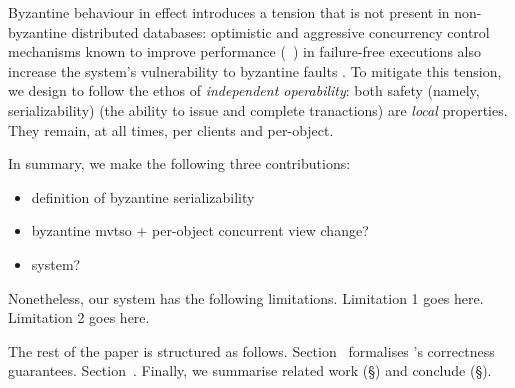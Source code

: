 Byzantine behaviour in effect introduces a tension that is not present in non-byzantine
distributed databases: optimistic and aggressive concurrency control mechanisms known
to improve performance (~\cite{occ,mvtso,pipeline,tapir}) in failure-free executions also increase the system's vulnerability to byzantine faults . To mitigate this tension, we design \sys{} to follow the ethos of \textit{independent operability}: both safety (namely, serializability) (the ability to issue and complete tranactions)
are \textit{local} properties. They remain, at all times, per clients and per-object.
 

In summary, we make the following three contributions: 
\begin{itemize}
\item definition of byzantine serializability
\item  byzantine mvtso + per-object concurrent view change?
\item system?
\end{itemize}

Nonetheless, our system has the following limitations. Limitation 1 goes here. Limitation 2 goes here.

The rest of the paper is structured as follows. Section~ formalises \sys{}'s correctness guarantees.
Section~. Finally, we summarise related work (\S{}) and conclude (\S{}).

